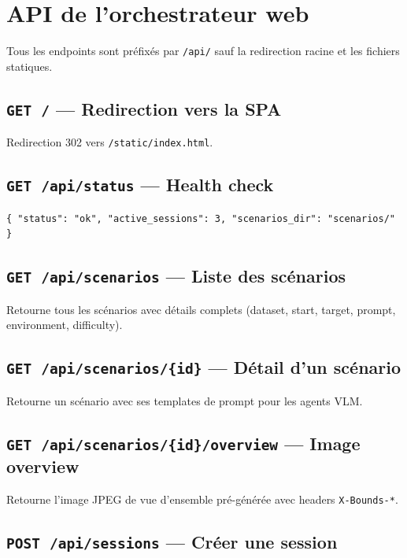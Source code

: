 \documentclass[a4paper, 11pt, french]{article}
\newcommand{\code}[1]{\texttt{#1}}
\newcommand{\apiendpoint}[2]{\texorpdfstring{\texttt{#1}~\texttt{#2}}{#1 #2}}
\begin{document}
\section{API de l'orchestrateur web}
\label{sec:api-orch}

Tous les endpoints sont préfixés par \code{/api/} sauf la redirection
racine et les fichiers statiques.

\subsection{\apiendpoint{GET}{/} --- Redirection vers la SPA}

Redirection 302 vers \code{/static/index.html}.

\subsection{\apiendpoint{GET}{/api/status} --- Health check}

\begin{lstlisting}[style=json]
{ "status": "ok", "active_sessions": 3, "scenarios_dir": "scenarios/" }
\end{lstlisting}

\subsection{\apiendpoint{GET}{/api/scenarios} --- Liste des scénarios}

Retourne tous les scénarios avec détails complets (dataset, start, target,
prompt, environment, difficulty).

\subsection{\apiendpoint{GET}{/api/scenarios/\{id\}} --- Détail d'un scénario}

Retourne un scénario avec ses templates de prompt pour les agents VLM.

\subsection{\apiendpoint{GET}{/api/scenarios/\{id\}/overview} --- Image overview}

Retourne l'image JPEG de vue d'ensemble pré-générée avec headers
\code{X-Bounds-*}.

\subsection{\apiendpoint{POST}{/api/sessions} --- Créer une session}
\end{document}
